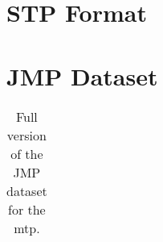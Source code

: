 
\chapter{STP Format}\label{chap:app:examples}


\chapter{JMP Dataset}
\centering
\begin{table}[h!]\centering
\begin{tabular}[h!]{c|c|c}
  
\end{tabular}
\caption{Full version of the JMP dataset for the \gls{mtp}.}\label{tab:app:jmp}
\end{table}
